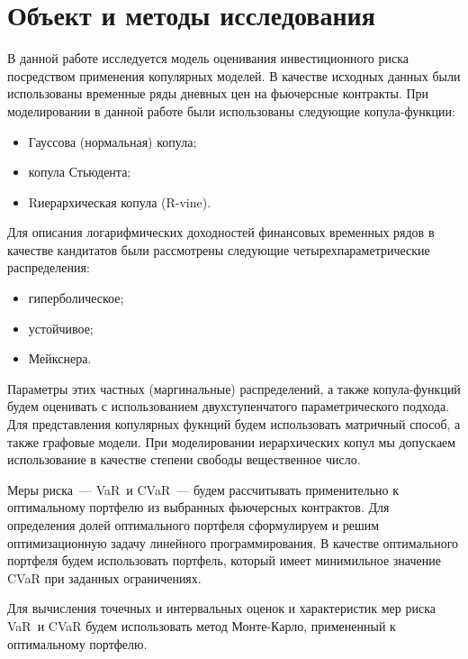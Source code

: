 \section{Объект и методы исследования}
\label{section:object}

В данной работе исследуется модель оценивания инвестиционного риска посредством применения копулярных моделей.
В качестве исходных данных были использованы временные ряды дневных цен на фьючерсные контракты.
При моделировании в данной работе были использованы следующие копула-функции:
\begin{itemize}
    \item Гауссова (нормальная) копула;
    \item копула Стьюдента;
    \item R\-иерархическая копула (R-vine).
\end{itemize}

Для описания логарифмических доходностей финансовых временных рядов в качестве кандитатов были рассмотрены следующие четырехпараметрические распределения:
\begin{itemize}
    \item гиперболическое;
    \item устойчивое;
    \item Мейкснера.
\end{itemize}
%
Параметры этих частных (маргинальные) распределений, а также копула-функций будем оценивать с использованием двухступенчатого параметрического подхода.
Для представления копулярных фукнций будем использовать матричный способ, а также графовые модели.
При моделировании иерархических копул мы допускаем использование в качестве  степени свободы вещественное число.

Меры риска~--- VaR~и CVaR~--- будем рассчитывать применительно к оптимальному портфелю из выбранных фьючерсных контрактов.
Для определения долей оптимального портфеля сформулируем и решим оптимизационную задачу линейного программирования. В качестве оптимального портфеля будем использовать портфель, который имеет минимильное значение CVaR при заданных ограничениях.

Для вычисления точечных и интервальных оценок и характеристик мер риска VaR~и CVaR будем использовать метод Монте-Карло, примененный к оптимальному портфелю.
